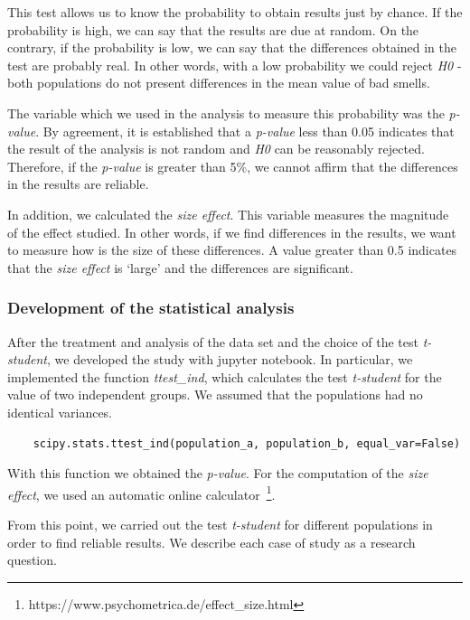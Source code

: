 This test allows us to know the probability to obtain results just by chance. If the probability is high, we can say that the results are due at random. On the contrary, if the probability is low, we can say that the differences obtained in the test are probably real. In other words, with a low probability we could reject \textit{H0} -both populations do not present differences in the mean value of bad smells. 

The variable which we used in the analysis to measure this probability was the \textit{p-value}. By agreement, it is established that a \textit{p-value} less than 0.05 indicates that the result of the analysis is not random and \textit{H0} can be reasonably rejected. Therefore, if the \textit{p-value} is greater than 5\%, we cannot affirm that the differences in the results are reliable.  

In addition, we calculated the \textit{size effect}. This variable measures the magnitude of the effect studied. In other words, if we find differences in the results, we want to measure how is the size of these differences. A value greater than 0.5 indicates that the \textit{size effect} is `large' and the differences are significant.

\subsubsection{Development of the statistical analysis}
\label{subsubsec:development_statistical_analysis}

After the treatment and analysis of the data set and the choice of the test \textit{t-student}, we developed the study with jupyter notebook. In particular, we implemented the function \textit{ttest\_ind}, which calculates the test \textit{t-student} for the value of two independent groups. We assumed that the populations had no identical variances.


{\footnotesize
\begin{verbatim}
    scipy.stats.ttest_ind(population_a, population_b, equal_var=False)
\end{verbatim}
}

With this function we obtained the \textit{p-value}. For the computation of the \textit{size effect}, we used an automatic online calculator~\footnote{https://www.psychometrica.de/effect\_size.html}.

From this point, we carried out the test \textit{t-student} for different populations in order to find reliable results. We describe each case of study as a research question.


